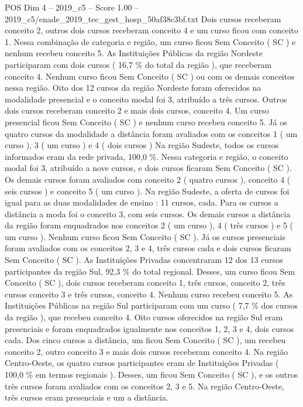 \begin{textsample}{POS Dim 4 – 2019\_c5 – Score 1.00 – 2019\_c5/enade\_2019\_tec\_gest\_hosp\_50af38c3bf.txt}
Dois cursos receberam conceito 2, outros dois cursos receberam conceito 4 e um curso ficou com conceito 1.
Nessa combinação de categoria e região, um curso ficou Sem Conceito ( SC ) e nenhum recebeu conceito 5.
As Instituições Públicas da região Nordeste participaram com dois cursos ( 16,7 \% do total da região ), que receberam conceito 4.
Nenhum curso ficou Sem Conceito ( SC ) ou com os demais conceitos nessa região.
Oito dos 12 cursos da região Nordeste foram oferecidos na modalidade presencial e o conceito modal foi 3, atribuído a três cursos.
Outros dois cursos receberam conceito 2 e mais dois cursos, conceito 4.
Um curso presencial ficou Sem Conceito ( SC ) e nenhum curso recebeu conceito 5.
Já os quatro cursos da modalidade a distância foram avaliados com os conceitos 1 ( um curso ), 3 ( um curso ) e 4 ( dois cursos ) Na região Sudeste, todos os cursos informados eram da rede privada, 100,0 \%.
Nessa categoria e região, o conceito modal foi 3, atribuído a nove cursos, e dois cursos ficaram Sem Conceito ( SC ).
Os demais cursos foram avaliados com conceito 2 ( quatro cursos ), conceito 4 ( seis cursos ) e conceito 5 ( um curso ).
Na região Sudeste, a oferta de cursos foi igual para as duas modalidades de ensino : 11 cursos, cada.
Para os cursos a distância a moda foi o conceito 3, com seis cursos.
Os demais cursos a distância da região foram enquadrados nos conceitos 2 ( um curso ), 4 ( três cursos ) e 5 ( um curso ).
Nenhum curso ficou Sem Conceito ( SC ).
Já os cursos presenciais foram avaliados com os conceitos 2, 3 e 4, três cursos cada e dois cursos ficaram Sem Conceito ( SC ).
As Instituições Privadas concentraram 12 dos 13 cursos participantes da região Sul, 92,3 \% do total regional.
Desses, um curso ficou Sem Conceito ( SC ), dois cursos receberam conceito 1, três cursos, conceito 2, três cursos conceito 3 e três cursos, conceito 4.
Nenhum curso recebeu conceito 5.
As Instituições Públicas na região Sul participaram com um curso ( 7,7 \% dos cursos da região ), que recebeu conceito 4.
Oito cursos oferecidos na região Sul eram presenciais e foram enquadrados igualmente nos conceitos 1, 2, 3 e 4, dois cursos cada.
Dos cinco cursos a distância, um ficou Sem Conceito ( SC ), um recebeu conceito 2, outro conceito 3 e mais dois cursos receberam conceito 4.
Na região Centro-Oeste, os quatro cursos participantes eram de Instituições Privadas ( 100,0 \% em termos regionais ).
Desses, um ficou Sem Conceito ( SC ), e os outros três cursos foram avaliados com os conceitos 2, 3 e 5.
Na região Centro-Oeste, três cursos eram presenciais e um a distância.

\end{textsample}
